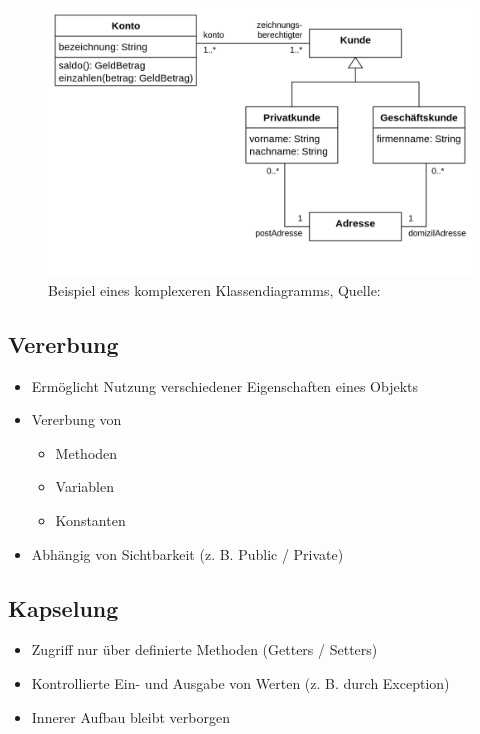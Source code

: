 \begin{figure}
    \includegraphics[width=\linewidth]{bilder/klassendiagramm.png}
    \caption{Beispiel eines komplexeren Klassendiagramms, Quelle: \textcite{wikipediabenutzerUMLKlassendiagramm}}
    \label{fig:bsp_klassendiagramm}
\end{figure}

\subsection{Vererbung}
\begin{itemize}
    \item Ermöglicht Nutzung verschiedener Eigenschaften eines Objekts
    \item Vererbung von
    \begin{itemize}
        \item Methoden
        \item Variablen
        \item Konstanten
    \end{itemize}
    \item Abhängig von Sichtbarkeit (z. B. Public / Private)
\end{itemize}

\subsection{Kapselung}
\begin{itemize}
    \item Zugriff nur über definierte Methoden (Getters / Setters)
    \item Kontrollierte Ein- und Ausgabe von Werten (z. B. durch Exception)
    \item Innerer Aufbau bleibt verborgen
\end{itemize}

